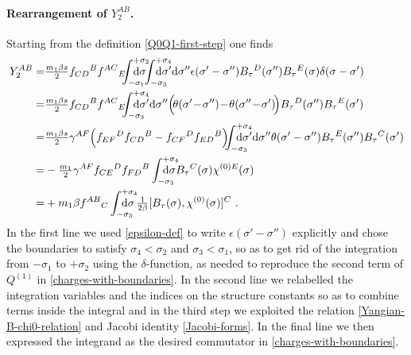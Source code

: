 \documentclass[12pt]{article}
\numberwithin{equation}{section}
\begin{document}
\paragraph{Rearrangement of $Y_{2}^{AB}$.} Starting from the definition \eqref{Q0Q1-first-step} one finds
\begin{equation}\label{manipulation-Y2AB}
\begin{aligned}
Y_{2}^{AB}=&\tfrac{m_{1}\beta s}{2}f_{CD}{}^{B}f^{AC}{}_{E}\!\!\!\int_{-\sigma_{1}}^{+\sigma_{2}}\!\!\!\!\!\!\!\!\!\!\mathrm{d}\sigma \!\! \int_{-\sigma_{3}}^{+\sigma_{4}}\!\!\!\!\!\!\!\!\!\!\mathrm{d}\sigma'\mathrm{d}\sigma''  \epsilon(\sigma'-\sigma'')B_{\tau}{}^{D}(\sigma'')B_{\tau}{}^{E}(\sigma)\delta(\sigma-\sigma')
\\
=&\tfrac{m_{1}\beta s}{2}f_{CD}{}^{B}f^{AC}{}_{E}\!\!\! \int_{-\sigma_{3}}^{+\sigma_{4}}\!\!\!\!\!\!\!\!\!\!\mathrm{d}\sigma'\mathrm{d}\sigma''  \Bigl( \! \theta(\sigma'\!-\!\sigma'')\!-\!\theta(\sigma'' \!-\!\sigma') \!\Bigr)B_{\tau}{}^{D}(\sigma'')B_{\tau}{}^{E}(\sigma')
\\
=&\tfrac{m_{1}\beta s}{2}\gamma^{AF} \Bigl( f_{EF}{}^{D}f_{CD}{}^{B}-f_{CF}{}^{D}f_{ED}{}^{B} \Bigr) \!\!\! \int_{-\sigma_{3}}^{+\sigma_{4}}\!\!\!\!\!\!\!\!\!\!\mathrm{d}\sigma'\mathrm{d}\sigma''\theta(\sigma'-\sigma'') B_{\tau}{}^{E}(\sigma'')B_{\tau}{}^{C}(\sigma')
\\
=&-\tfrac{m_{1}}{2}\gamma^{AF} f_{CE}{}^{D}f_{FD}{}^{B} \int_{-\sigma_{3}}^{+\sigma_{4}}\!\!\!\!\!\!\!\!\!\!\mathrm{d}\sigma B_{\tau}{}^{C}(\sigma)\chi^{(0)E}(\sigma)
\\
=& + m_{1}\beta f^{AB}{}_{C} \int_{-\sigma_{3}}^{+\sigma_{4}}\!\!\!\!\!\!\!\!\!\!\mathrm{d}\sigma \, \tfrac{1}{2\beta}[B_{\tau}(\sigma),\chi^{(0)}(\sigma)]^{C} \,\, .
\end{aligned}
\end{equation}
In the first line we used \eqref{epsilon-def} to write $\epsilon(\sigma'-\sigma'')$ explicitly and chose the boundaries to satisfy $\sigma_{4}<\sigma_{2}$ and $\sigma_{3}<\sigma_{1}$, so as to get rid of the integration from $-\sigma_{1}$ to $+\sigma_{2}$ using the $\delta$-function, as needed to reproduce the second term of $Q^{(1)}$ in \eqref{charges-with-boundaries}. In the second line we relabelled the integration variables and the indices on the structure constants so as to combine terms inside the integral and in the third step we exploited the relation \eqref{Yangian-B-chi0-relation} and Jacobi identity \eqref{Jacobi-forms}. In the final line we then expressed the integrand as the desired commutator in \eqref{charges-with-boundaries}.
\end{document}
